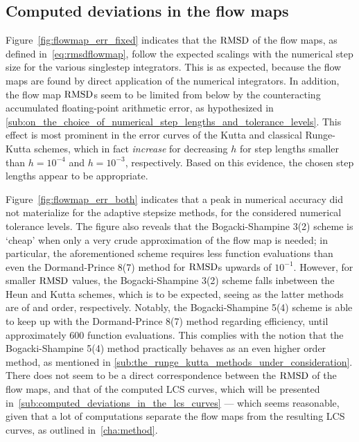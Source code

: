 \subsection{Computed deviations in the flow maps}
\label{sub:computed_deviations_in_the_flow_maps}
Figure~\ref{fig:flowmap_err_fixed} indicates that the $\operatorname{RMSD}$ of the flow maps,
as defined in~\cref{eq:rmsdflowmap}, follow the expected scalings with the
numerical step size for the various singlestep integrators. This is as expected,
because the flow maps are found by direct application of the numerical
integrators. In addition, the flow map $\operatorname{RMSD}$s seem to be limited from below
by the counteracting accumulated floating-point arithmetic error, as
hypothesized in
\cref{sub:on_the_choice_of_numerical_step_lengths_and_tolerance_levels}.
This effect is most prominent in the error curves of the Kutta and
classical Runge-Kutta schemes, which in fact \emph{increase} for decreasing
$h$ for step lengths smaller than $h=10^{-4}$ and $h=10^{-3}$, respectively.
Based on this evidence, the chosen step lengths appear to be appropriate.

Figure~\ref{fig:flowmap_err_both} indicates that a peak in numerical accuracy
did not materialize for the adaptive stepsize methods, for the considered
numerical tolerance levels. The figure also reveals that the Bogacki-Shampine
3(2) scheme is `cheap' when only a very crude approximation of the flow map is
needed; in particular, the aforementioned scheme requires less function
evaluations than even the Dormand-Prince 8(7) method for $\operatorname{RMSD}$s upwards of
$10^{-1}$. However, for smaller $\operatorname{RMSD}$ values, the Bogacki-Shampine 3(2)
scheme falls inbetween the Heun and Kutta schemes, which is to be expected,
seeing as the latter methods are of  and  order, respectively.
Notably, the Bogacki-Shampine 5(4) scheme is able to keep up with the
Dormand-Prince 8(7) method regarding efficiency, until approximately $600$
function evaluations. This complies with the notion that the Bogacki-Shampine
5(4) method practically behaves as an even higher order method, as mentioned in
\cref{sub:the_runge_kutta_methods_under_consideration}.
There does not seem to be a direct correspondence between the
$\operatorname{RMSD}$ of the flow maps, and that of the computed LCS curves, which will be
presented in~\cref{sub:computed_deviations_in_the_lcs_curves} --- which seems
reasonable, given that a lot of computations separate the flow maps from the
resulting LCS curves, as outlined in~\cref{cha:method}.




